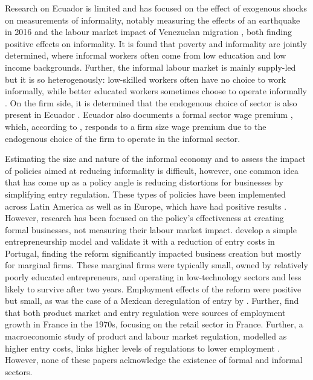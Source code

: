 \documentclass[11pt,a4paper]{article}\usepackage[]{graphicx}\usepackage[]{xcolor}
\begin{document}
Research on Ecuador is limited and has focused on the effect of exogenous shocks on measurements of informality, notably measuring the effects of an earthquake in 2016 \parencite{Mendoza.2020} and the labour market impact of Venezuelan migration \parencite{Olivieri.2022}, both finding positive effects on informality. It is found that poverty and informality are jointly determined, where informal workers often come from low education and low income backgrounds. Further, the informal labour market is mainly supply-led but it is so heterogenously: low-skilled workers often have no choice to work informally, while better educated workers sometimes choose to operate informally \parencite{Canelas.2019}. On the firm side, it is determined that the endogenous choice of sector is also present in Ecuador \parencite{Medvedev.2016}. Ecuador also documents a formal sector wage premium \textcite{MacIsaac.1997}, which, according to \textcite{ElianeElBadaoui.2010}, responds to a firm size wage premium due to the endogenous choice of the firm to operate in the informal sector. 

Estimating the size and nature of the informal economy and to assess the impact of policies aimed at reducing informality is difficult, however, one common idea that has come up as a policy angle is reducing distortions for businesses by simplifying entry regulation. These types of policies have been implemented across Latin America as well as in Europe, which have had positive results \parencite{Oviedo.2009}. However, research has been focused on the policy's effectiveness at creating formal businesses, not measuring their labour market impact. \textcite{Branstetter.2014} develop a simple entrepreneurship model and validate it with a reduction of entry costs in Portugal, finding the reform significantly impacted business creation but mostly for marginal firms. These marginal firms were typically small, owned by relatively poorly educated entrepreneurs, and operating in low-technology sectors and less likely to survive after two years. Employment effects of the reform were positive but small, as was the case of a Mexican deregulation of entry by \textcite{Kaplan.2011}. Further, \textcite{Bertrand.2002} find that both product market and entry regulation were sources of employment growth in France in the 1970s, focusing on the retail sector in France. Further, a macroeconomic study of product and labour market regulation, modelled as higher entry costs, links higher levels of regulations to lower employment \parencite{Blanchard.2003}. However, none of these papers acknowledge the existence of formal and informal sectors.
\end{document}
